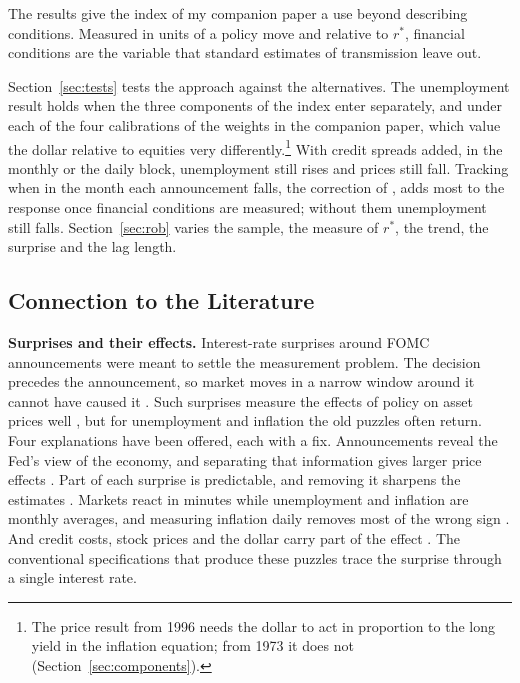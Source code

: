 \documentclass[11pt]{article}
\newcommand{\rs}{r^{*}}
\begin{document}
The results give the index of my companion paper \citep{fcinote} a use beyond describing conditions. Measured in units of a policy move and relative to $\rs$, financial conditions are the variable that standard estimates of transmission leave out.

Section~\ref{sec:tests} tests the approach against the alternatives. The unemployment result holds when the three components of the index enter separately, and under each of the four calibrations of the weights in the companion paper, which value the dollar relative to equities very differently.\footnote{The price result from 1996 needs the dollar to act in proportion to the long yield in the inflation equation; from 1973 it does not (Section~\ref{sec:components}).} With credit spreads added, in the monthly or the daily block, unemployment still rises and prices still fall. Tracking when in the month each announcement falls, the correction of \citet{jacobson2026}, adds most to the response once financial conditions are measured; without them unemployment still falls. Section~\ref{sec:rob} varies the sample, the measure of $\rs$, the trend, the surprise and the lag length.

\subsection{Connection to the Literature}
\textbf{Surprises and their effects.} Interest-rate surprises around FOMC announcements were meant to settle the measurement problem. The decision precedes the announcement, so market moves in a narrow window around it cannot have caused it \citep{kuttner2001,gurkaynak2005}. Such surprises measure the effects of policy on asset prices well \citep{bernanke2005,hanson2015,nakamura2018,swanson2021}, but for unemployment and inflation the old puzzles often return. Four explanations have been offered, each with a fix. Announcements reveal the Fed's view of the economy, and separating that information gives larger price effects \citep{romer2000,nakamura2018,jarocinski2020,miranda2021}. Part of each surprise is predictable, and removing it sharpens the estimates \citep{bauer2023,bauer2023aer}. Markets react in minutes while unemployment and inflation are monthly averages, and measuring inflation daily removes most of the wrong sign \citep{jacobson2026}. And credit costs, stock prices and the dollar carry part of the effect \citep{gertler2015,caldara2019,kroencke2021,bauer2023jep,boehm2024,bauer2026,boehm2026}. The conventional specifications that produce these puzzles trace the surprise through a single interest rate.
\end{document}

